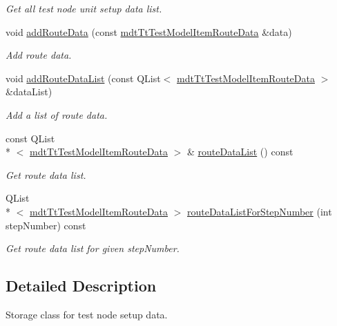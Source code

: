 \begin{DoxyCompactItemize}
\begin{DoxyCompactList}\small\item\em Get all test node unit setup data list. \end{DoxyCompactList}\item 
void \hyperlink{classmdt_tt_test_node_setup_data_ad09feb6268a1d4b5a53b7e115d0e1c46}{add\-Route\-Data} (const \hyperlink{classmdt_tt_test_model_item_route_data}{mdt\-Tt\-Test\-Model\-Item\-Route\-Data} \&data)
\begin{DoxyCompactList}\small\item\em Add route data. \end{DoxyCompactList}\item 
void \hyperlink{classmdt_tt_test_node_setup_data_ad2d5fc0f74acb2d44ca16d62a49ea68d}{add\-Route\-Data\-List} (const Q\-List$<$ \hyperlink{classmdt_tt_test_model_item_route_data}{mdt\-Tt\-Test\-Model\-Item\-Route\-Data} $>$ \&data\-List)
\begin{DoxyCompactList}\small\item\em Add a list of route data. \end{DoxyCompactList}\item 
const Q\-List\\*
$<$ \hyperlink{classmdt_tt_test_model_item_route_data}{mdt\-Tt\-Test\-Model\-Item\-Route\-Data} $>$ \& \hyperlink{classmdt_tt_test_node_setup_data_a0e201dca1ac16e5943ab49b4a94e0981}{route\-Data\-List} () const 
\begin{DoxyCompactList}\small\item\em Get route data list. \end{DoxyCompactList}\item 
Q\-List\\*
$<$ \hyperlink{classmdt_tt_test_model_item_route_data}{mdt\-Tt\-Test\-Model\-Item\-Route\-Data} $>$ \hyperlink{classmdt_tt_test_node_setup_data_a058b7c7f29adb29ead5e01dc262c855b}{route\-Data\-List\-For\-Step\-Number} (int step\-Number) const 
\begin{DoxyCompactList}\small\item\em Get route data list for given step\-Number. \end{DoxyCompactList}\end{DoxyCompactItemize}


\subsection{Detailed Description}
Storage class for test node setup data. 

